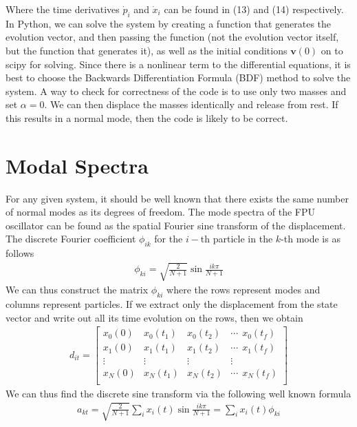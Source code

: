 \documentclass{article}
\newcommand{\ve}{\mathbf}
\begin{document}
Where the time derivatives $\dot{p}_i$ and $\dot{x}_i$ can be found in (13) and (14) respectively. In Python, 
we can solve the system by creating a function that generates the evolution vector, 
and then passing the function (not the evolution vector itself, but the function that generates it), as well as the initial conditions 
$\ve{v}(0)$ on to 
scipy for solving. Since there is a nonlinear term to the differential equations, 
it is best to choose the Backwards Differentiation Formula (BDF) method to solve the system. 
A way to check for correctness of the code is to use only two masses and set 
$\alpha=0$. We can then 
displace the masses identically and release from rest. If this results in a normal mode, then the code is likely to be correct.

\section{Modal Spectra}
For any given system, it should be well known that there exists the same number of normal modes 
as its degrees of freedom. The mode spectra of the FPU oscillator can be found as the spatial Fourier sine 
transform of the displacement. The discrete Fourier coefficient $\phi_{ik}$ for the 
$i-$th particle in the $k$-th mode is as follows
\begin{align}
    \phi_{ki}=\sqrt{\frac{2}{N+1}}\sin\frac{ik\pi}{N+1}
\end{align}
We can thus construct the matrix $\phi_{ki}$ where the rows represent modes and 
columns represent particles. If we extract only the displacement from the state vector
and write out all its time evolution on the rows, then we obtain 
\begin{align}
    d_{it}=\begin{bmatrix}
        x_0(0)& x_0(t_1) & x_0(t_2) &\cdots \ \  x_0(t_f)\\ 
        x_1(0)& x_1(t_1) & x_1(t_2) &\cdots \ \  x_1(t_f)\\ 
       \vdots& \vdots & \vdots & \vdots\\ 
        x_N(0)& x_N(t_1) & x_N(t_2) &\cdots \ \ x_N(t_f)\\ 
    \end{bmatrix}
\end{align} 
We can thus find the discrete sine transform via the following well known formula 
\begin{align}
    a_{kt}=\sqrt{\frac{2}{N+1}}\sum_ix_i(t)\sin{\frac{ik\pi}{N+1}}=\sum_ix_{i}(t)\phi_{ki}
\end{align}
\end{document}
